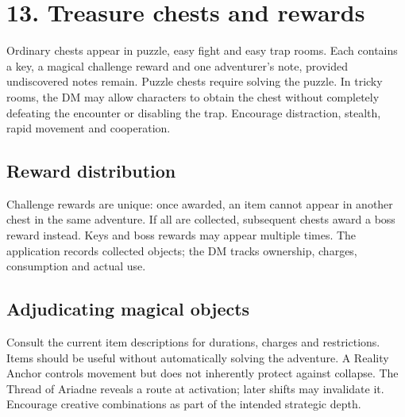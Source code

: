 \section{13. Treasure chests and rewards}

Ordinary chests appear in puzzle, easy fight and easy trap rooms. Each contains a key, a magical challenge reward and one adventurer's note, provided undiscovered notes remain. Puzzle chests require solving the puzzle. In tricky rooms, the DM may allow characters to obtain the chest without completely defeating the encounter or disabling the trap. Encourage distraction, stealth, rapid movement and cooperation.

\subsection{Reward distribution}

Challenge rewards are unique: once awarded, an item cannot appear in another chest in the same adventure. If all are collected, subsequent chests award a boss reward instead. Keys and boss rewards may appear multiple times. The application records collected objects; the DM tracks ownership, charges, consumption and actual use.

\subsection{Adjudicating magical objects}

Consult the current item descriptions for durations, charges and restrictions. Items should be useful without automatically solving the adventure. A Reality Anchor controls movement but does not inherently protect against collapse. The Thread of Ariadne reveals a route at activation; later shifts may invalidate it. Encourage creative combinations as part of the intended strategic depth.

